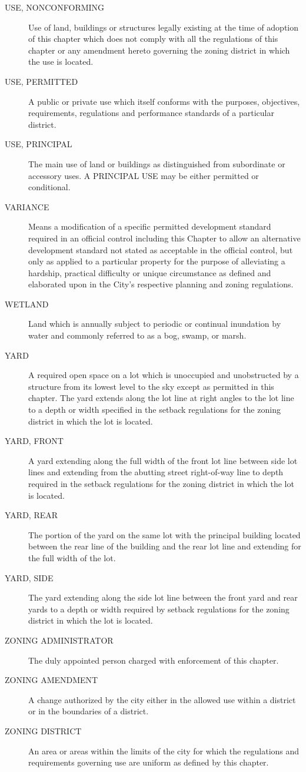 \begin{description}
    \item[USE, NONCONFORMING] Use of land, buildings or structures legally existing at the time of adoption of this chapter which does not comply with all the regulations of this chapter or any amendment hereto governing the zoning district in which the use is located.
    \item[USE, PERMITTED] A public or private use which itself conforms with the purposes, objectives, requirements, regulations and performance standards of a particular district.
    \item[USE, PRINCIPAL] The main use of land or buildings as distinguished from subordinate or accessory uses.  A PRINCIPAL USE may be either permitted or conditional.
    \item[VARIANCE] Means a modification of a specific permitted development standard required in an official control including this Chapter to allow an alternative development standard not stated as acceptable in the official control, but only as applied to a particular property for the purpose of alleviating a hardship, practical difficulty or unique circumstance as defined and elaborated upon in the City's respective planning and zoning regulations.
    \item[WETLAND] Land which is annually subject to periodic or continual inundation by water and commonly referred to as a bog, swamp, or marsh.
    \item[YARD] A required open space on a lot which is unoccupied and unobstructed by a structure from its lowest level to the sky except as permitted in this chapter. The yard extends along the lot line at right angles to the lot line to a depth or width specified in the setback regulations for the zoning district in which the lot is located.
    \item[YARD, FRONT] A yard extending along the full width of the front lot line between side lot lines and extending from the abutting street right-of-way line to depth required in the setback regulations for the zoning district in which the lot is located.
    \item[YARD, REAR] The portion of the yard on the same lot with the principal building located between the rear line of the building and the rear lot line and extending for the full width of the lot.
    \item[YARD, SIDE] The yard extending along the side lot line between the front yard and rear yards to a depth or width required by setback regulations for the zoning district in which the lot is located.
    \item[ZONING ADMINISTRATOR] The duly appointed person charged with enforcement of this chapter.
    \item[ZONING AMENDMENT] A change authorized by the city either in the allowed use within a district or in the boundaries of a district.
    \item[ZONING DISTRICT] An area or areas within the limits of the city for which the regulations and requirements governing use are uniform as defined by this chapter.
\end{description}

